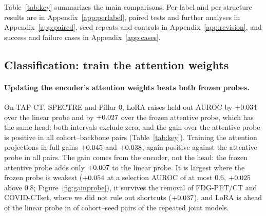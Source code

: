 \begin{table}[tb]
\centering
\caption{The main comparisons at label level: mean difference, 95\% interval over cohorts, labels and held-out cases, and the number of cohorts (datasets) with a positive mean. Modes are averaged per label except in the LoRA $-$ Dec sub-rows; LoRA $-$ Attn compares methods with the same head. VoCo covers three classification cohorts; pooled estimates are in Table~\ref{tab:cis}.}
\label{tab:key}
\renewcommand{\mci}[3]{#1\,{\scriptsize[#2, #3]}}
\end{table}

Table~\ref{tab:key} summarizes the main comparisons. Per-label and per-structure results are in Appendix~\ref{app:perlabel}, paired tests and further analyses in Appendix~\ref{app:paired}, seed repeats and controls in Appendix~\ref{app:revision}, and success and failure cases in Appendix~\ref{app:cases}.

\subsection{Classification: train the attention weights}
\label{sec:clsres}

\paragraph{Updating the encoder's attention weights beats both frozen probes.} On TAP-CT, SPECTRE and Pillar-0, LoRA raises held-out AUROC by $+0.034$ over the linear probe and by $+0.027$ over the frozen attentive probe, which has the same head; both intervals exclude zero, and the gain over the attentive probe is positive in all \numCiClsloraattnAllClustersN{} cohort--backbone pairs (Table~\ref{tab:key}). Training the attention projections in full gains $+0.045$ and $+0.038$, again positive against the attentive probe in all \numCiClsattnftattnAllClustersN{} pairs. The gain comes from the encoder, not the head: the frozen attentive probe adds only $+0.007$ to the linear probe. It is largest where the frozen probe is weakest ($+0.054$ at a selection AUROC of at most 0.6, $+0.025$ above 0.8; Figure~\ref{fig:gainprobe}), it survives the removal of FDG-PET/CT and COVID-CTset, where we did not rule out shortcuts ($+0.037$), and LoRA is ahead of the linear probe in \numSeedsclsLoraLinAllPosN{} of \numSeedsclsLoraLinAllPairsN{} cohort--seed pairs of the repeated joint models.

